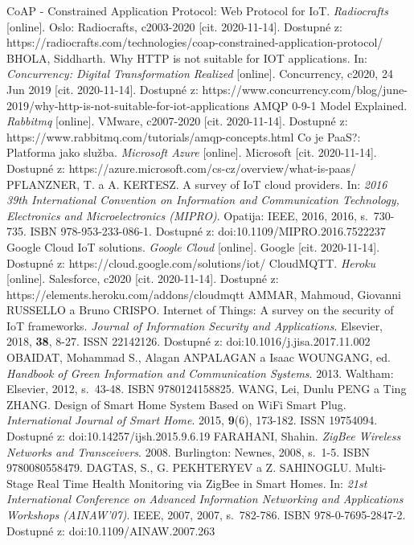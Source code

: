 \documentclass[twoside]{ctuthesis}
\theoremstyle{plain}
\theoremstyle{definition}
\theoremstyle{note}
\begin{document}
\begin{thebibliography}{46}
    CoAP - Constrained Application Protocol: Web Protocol for IoT. \textit{Radiocrafts} [online]. Oslo: Radiocrafts, c2003-2020 [cit. 2020-11-14]. Dostupné z: https://radiocrafts.com/technologies/coap-constrained-application-protocol/
     BHOLA, Siddharth. Why HTTP is not suitable for IOT applications. In: \textit{Concurrency: Digital Transformation Realized} [online]. Concurrency, c2020, 24 Jun 2019 [cit. 2020-11-14]. Dostupné z: https://www.concurrency.com/blog/june-2019/why-http-is-not-suitable-for-iot-applications
 AMQP 0-9-1 Model Explained. \textit{Rabbitmq} [online]. VMware, c2007-2020 [cit. 2020-11-14]. Dostupné z: https://www.rabbitmq.com/tutorials/amqp-concepts.html
    Co je PaaS?: Platforma jako služba. \textit{Microsoft Azure} [online]. Microsoft [cit. 2020-11-14]. Dostupné z: https://azure.microsoft.com/cs-cz/overview/what-is-paas/   
    PFLANZNER, T. a A. KERTESZ. A survey of IoT cloud providers. In: \textit{2016 39th International Convention on Information and Communication Technology, Electronics and Microelectronics (MIPRO)}. Opatija: IEEE, 2016, 2016, s.~730-735. ISBN 978-953-233-086-1. Dostupné z: doi:10.1109/MIPRO.2016.7522237
  Google Cloud IoT solutions. \textit{Google Cloud} [online]. Google [cit. 2020-11-14]. Dostupné z: https://cloud.google.com/solutions/iot/
  CloudMQTT. \textit{Heroku} [online]. Salesforce, c2020 [cit. 2020-11-14]. Dostupné z: https://elements.heroku.com/addons/cloudmqtt
 AMMAR, Mahmoud, Giovanni RUSSELLO a Bruno CRISPO. Internet of Things: A survey on the security of IoT frameworks. \textit{Journal of Information Security and Applications}. Elsevier, 2018, \textbf{38}, 8-27. ISSN 22142126. Dostupné z: doi:10.1016/j.jisa.2017.11.002
 OBAIDAT, Mohammad S., Alagan ANPALAGAN a Isaac WOUNGANG, ed. \textit{Handbook of Green Information and Communication Systems}. 2013. Waltham: Elsevier, 2012, s.~43-48. ISBN 9780124158825.
 WANG, Lei, Dunlu PENG a Ting ZHANG. Design of Smart Home System Based on WiFi Smart Plug. \textit{International Journal of Smart Home}. 2015, \textbf{9}(6), 173-182. ISSN 19754094. Dostupné z: doi:10.14257/ijsh.2015.9.6.19
  FARAHANI, Shahin. \textit{ZigBee Wireless Networks and Transceivers}. 2008. Burlington: Newnes, 2008, s.~1-5. ISBN 9780080558479.
 DAGTAS, S., G. PEKHTERYEV a Z. SAHINOGLU. Multi-Stage Real Time Health Monitoring via ZigBee in Smart Homes. In: \textit{21st International Conference on Advanced Information Networking and Applications Workshops (AINAW'07)}. IEEE, 2007, 2007, s.~782-786. ISBN 978-0-7695-2847-2. Dostupné z: doi:10.1109/AINAW.2007.263

\end{thebibliography}
\end{document}
